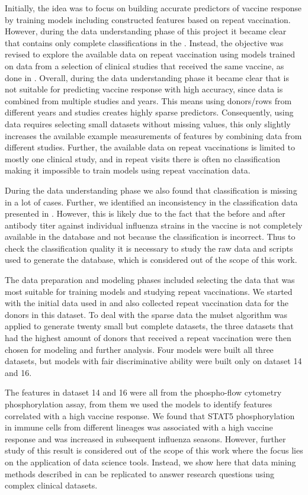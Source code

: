 Initially, the idea was to focus on building accurate predictors of vaccine response by training models including constructed features based on repeat vaccination. However, during the data understanding phase of this project it became clear that \flup contains only complete classifications in the \firstvis.
Instead, the objective was revised to explore the available data on repeat vaccination using models trained on \firstvis data from a selection of clinical studies that received the same vaccine, as done in \spaper.
Overall, during the data understanding phase it became clear that \flup is not suitable for predicting vaccine response with high accuracy, since data is combined from multiple studies and years.
This means using donors/rows from different years and studies creates highly sparse predictors.
Consequently, using \flup data requires selecting small datasets without missing values, this only slightly increases the available example measurements of features by combining data from different studies.
Further, the available data on repeat vaccinations is limited to mostly one clinical study, and in repeat visits there is often no classification making it impossible to train models using repeat vaccination data.

During the data understanding phase we also found that classification is missing in a lot of cases.
Further, we identified an inconsistency in the classification data presented in \flup.
However, this is likely due to the fact that the before and after antibody titer against individual influenza strains in the vaccine is not completely available in the database and not because the classification is incorrect.
Thus to check the classification quality it is necessary to study the raw data and scripts used to generate the database, which is considered out of the scope of this work.

The data preparation and modeling phases included selecting the data that was most suitable for training models and studying repeat vaccinations.
We started with the initial data used in \spaper and also collected repeat vaccination data for the donors in this dataset.
To deal with the sparse data the mulset algorithm was applied to generate twenty small but complete datasets, the three datasets that had the highest amount of donors that received a repeat vaccination were then chosen for modeling and further analysis.
Four models were built all three datasets, but models with fair discriminative ability were built only on dataset 14 and 16.

The features in dataset 14 and 16 were all from the phospho-flow cytometry phosphorylation assay, from them we used the models to identify features correlated with a high vaccine response.
We found that STAT5 phosphorylation in immune cells from different lineages was associated with a high vaccine response and was increased in subsequent influenza seasons.
However, further study of this result is considered out of the scope of this work where the focus lies on the application of data science tools.
Instead, we show here that data mining methods described in \spaper can be replicated to answer research questions using complex clinical datasets.


